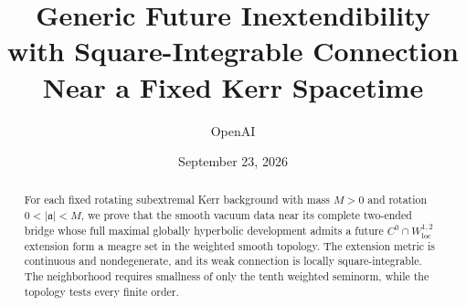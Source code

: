 \documentclass[11pt]{article}
\title{Generic Future Inextendibility with Square-Integrable Connection\\Near a Fixed Kerr Spacetime}
\author{OpenAI}
\date{September 23, 2026}
\begin{document}
\maketitle
\begin{abstract}
For each fixed rotating subextremal Kerr background with mass $M>0$ and
rotation $0<|\mathfrak a|<M$, we prove that the smooth vacuum data near
its complete two-ended bridge whose full maximal globally hyperbolic
development admits a future $C^0\cap W^{1,2}_{\mathrm{loc}}$ extension
form a meagre set in the weighted smooth topology. The extension metric
is continuous and nondegenerate, and its weak connection is locally
square-integrable. The neighborhood requires smallness of only the tenth
weighted seminorm, while the topology tests every finite order.
\end{abstract}
\tableofcontents









\end{document}
